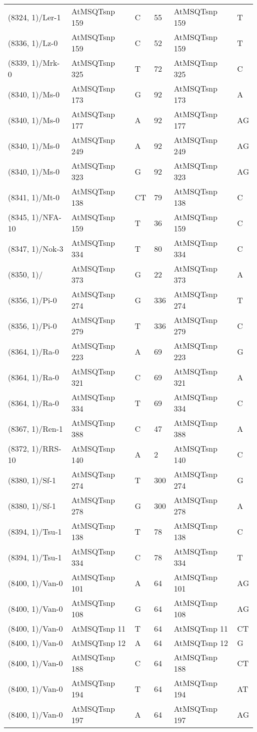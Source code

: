 \begin{center}
\begin{longtable}{|l|l|l|l|l|l|}
(8324, 1)/Ler-1&AtMSQTsnp 159&C&55&AtMSQTsnp 159&T\\
(8336, 1)/Lz-0&AtMSQTsnp 159&C&52&AtMSQTsnp 159&T\\
(8339, 1)/Mrk-0&AtMSQTsnp 325&T&72&AtMSQTsnp 325&C\\
(8340, 1)/Ms-0&AtMSQTsnp 173&G&92&AtMSQTsnp 173&A\\
(8340, 1)/Ms-0&AtMSQTsnp 177&A&92&AtMSQTsnp 177&AG\\
(8340, 1)/Ms-0&AtMSQTsnp 249&A&92&AtMSQTsnp 249&AG\\
(8340, 1)/Ms-0&AtMSQTsnp 323&G&92&AtMSQTsnp 323&AG\\
(8341, 1)/Mt-0&AtMSQTsnp 138&CT&79&AtMSQTsnp 138&C\\
(8345, 1)/NFA-10&AtMSQTsnp 159&T&36&AtMSQTsnp 159&C\\
(8347, 1)/Nok-3&AtMSQTsnp 334&T&80&AtMSQTsnp 334&C\\
(8350, 1)/&AtMSQTsnp 373&G&22&AtMSQTsnp 373&A\\
(8356, 1)/Pi-0&AtMSQTsnp 274&G&336&AtMSQTsnp 274&T\\
(8356, 1)/Pi-0&AtMSQTsnp 279&T&336&AtMSQTsnp 279&C\\
(8364, 1)/Ra-0&AtMSQTsnp 223&A&69&AtMSQTsnp 223&G\\
(8364, 1)/Ra-0&AtMSQTsnp 321&C&69&AtMSQTsnp 321&A\\
(8364, 1)/Ra-0&AtMSQTsnp 334&T&69&AtMSQTsnp 334&C\\
(8367, 1)/Ren-1&AtMSQTsnp 388&C&47&AtMSQTsnp 388&A\\
(8372, 1)/RRS-10&AtMSQTsnp 140&A&2&AtMSQTsnp 140&C\\
(8380, 1)/Sf-1&AtMSQTsnp 274&T&300&AtMSQTsnp 274&G\\
(8380, 1)/Sf-1&AtMSQTsnp 278&G&300&AtMSQTsnp 278&A\\
(8394, 1)/Tsu-1&AtMSQTsnp 138&T&78&AtMSQTsnp 138&C\\
(8394, 1)/Tsu-1&AtMSQTsnp 334&C&78&AtMSQTsnp 334&T\\
(8400, 1)/Van-0&AtMSQTsnp 101&A&64&AtMSQTsnp 101&AG\\
(8400, 1)/Van-0&AtMSQTsnp 108&G&64&AtMSQTsnp 108&AG\\
(8400, 1)/Van-0&AtMSQTsnp 11&T&64&AtMSQTsnp 11&CT\\
(8400, 1)/Van-0&AtMSQTsnp 12&A&64&AtMSQTsnp 12&G\\
(8400, 1)/Van-0&AtMSQTsnp 188&C&64&AtMSQTsnp 188&CT\\
(8400, 1)/Van-0&AtMSQTsnp 194&T&64&AtMSQTsnp 194&AT\\
(8400, 1)/Van-0&AtMSQTsnp 197&A&64&AtMSQTsnp 197&AG\\

\end{longtable}
\end{center}
